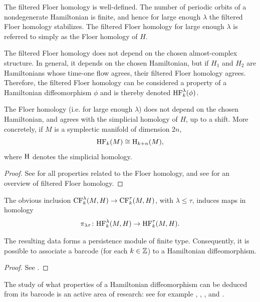 \begin{prop}
The filtered Floer homology is well-defined. The number of periodic orbits of a nondegenerate Hamiltonian is finite, and hence for large enough $\lambda$ the filtered Floer homology stabilizes. The filtered Floer homology for large enough $\lambda$ is referred to simply as the Floer homology of $H$.

The filtered Floer homology does not depend on the chosen almost-complex structure. In general, it depends on the chosen Hamiltonian, but if $H_1$ and $H_2$ are Hamiltonians whose time-one flow agrees, their filtered Floer homology agrees. Therefore, the filtered Floer homology can be considered a property of a Hamiltonian diffeomorphism $\phi$ and is thereby denoted $\mathrm{HF}_k^\lambda(\phi)$.

The Floer homology (i.e. for large enough $\lambda$) does not depend on the chosen Hamiltonian, and agrees with the simplicial homology of $H$, up to a shift. More concretely, if $M$ is a symplectic manifold of dimension $2n$,
\begin{equation}
\mathrm{HF}_k(M) \cong \mathrm{H}_{k+n}(M),
\end{equation}
where $\mathrm{H}$ denotes the simplicial homology.
\end{prop}

\begin{proof}
See \cite{audin} for all properties related to the Floer homology, and see \cite{polterovich} for an overview of filtered Floer homology.
\end{proof}

\begin{prop}
The obvious inclusion $\mathrm{CF}_k^\lambda(M,H) \to \mathrm{CF}_k^\tau(M,H)$, with $\lambda \leq \tau$, induces maps in homology
\begin{equation}
\pi_{\lambda\tau} \colon \mathrm{HF}_k^\lambda(M,H) \to \mathrm{HF}_k^\tau(M,H).
\end{equation}

The resulting data forms a persistence module of finite type. Consequently, it is possible to associate a barcode (for each $k \in \mathbb{Z}$) to a Hamiltonian diffeomorphism.
\end{prop}

\begin{proof}
See \cite{polterovich}.
\end{proof}

The study of what properties of a Hamiltonian diffeomorphism can be deduced from its barcode is an active area of research: see for example \cite{polterovich}, \cite{kislev2022bounds}, \cite{roux2018barcodes}, and \cite{polterovich2016autonomous}.

